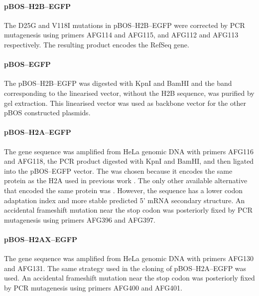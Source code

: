       \paragraph{pBOS--H2B--EGFP}
      The D25G and V118I mutations in pBOS--H2B--EGFP were corrected
      by PCR mutagenesis using primers AFG114 and AFG115, and AFG112
      and AFG113 respectively.  The resulting product encodes the
       RefSeq gene.

      \paragraph{pBOS--EGFP}
      The pBOS--H2B--EGFP was digested with KpnI and BamHI and the
      band corresponding to the linearised vector, without the H2B
      sequence, was purified by gel extraction.  This linearised vector
      was used as backbone vector for the other pBOS constructed
      plasmids.

      \paragraph{pBOS--H2A--EGFP}
      The  gene sequence was amplified from HeLa
      genomic DNA with primers AFG116 and AFG118, the PCR product
      digested with KpnI and BamHI, and then ligated into the
      pBOS--EGFP vector.  The  was chosen because it
      encodes the same protein as the H2A used in previous work
      \citep{flaus2004sin}.  The only other available alternative
      that encoded the same protein was .
      However, the  sequence has a lower codon
      adaptation index and more stable predicted 5' mRNA secondary structure.
      An accidental frameshift mutation near the stop codon was
      posteriorly fixed by PCR mutagenesis using primers AFG396 and
      AFG397.

      \paragraph{pBOS--H2AX--EGFP}
      The  gene sequence was amplified from HeLa genomic
      DNA with primers AFG130 and AFG131.  The same strategy used in
      the cloning of pBOS--H2A--EGFP was used.  An accidental
      frameshift mutation near the stop codon was posteriorly fixed by
      PCR mutagenesis using primers AFG400 and AFG401.

